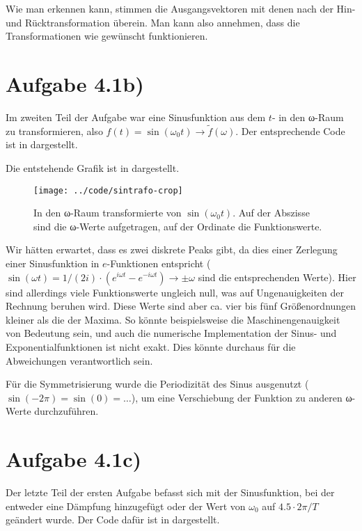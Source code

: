 Wie man erkennen kann, stimmen die Ausgangsvektoren mit denen nach der Hin- und
Rücktransformation überein. Man kann also annehmen, dass die Transformationen wie
gewünscht funktionieren.

\section*{Aufgabe 4.1b)}
Im zweiten Teil der Aufgabe war eine Sinusfunktion aus dem $t$- in den ω-Raum zu
transformieren, also $f(t) = \sin(ω_0t) → \tilde{f}(ω)$. Der entsprechende Code
ist in  dargestellt.



Die entstehende Grafik ist in  dargestellt.

\begin{figure}[htb]
\centering
  \texttt{[image: ../code/sintrafo-crop]}
  \caption{In den ω-Raum transformierte von $\sin(ω_0t)$. Auf der Abszisse sind
  die ω-Werte aufgetragen, auf der Ordinate die Funktionswerte.}
  \label{fig:sintrafo}
\end{figure}

Wir hätten erwartet, dass es zwei diskrete Peaks gibt, da dies einer Zerlegung 
einer Sinusfunktion in $e$-Funktionen entspricht ($\sin(ωt) = 1/(2i)\cdot(e^{iωt}
- e^{-iωt}) → \pm ω$ sind die entsprechenden Werte). Hier sind allerdings viele 
Funktionswerte ungleich null, was auf Ungenauigkeiten der Rechnung beruhen wird. 
Diese Werte sind aber ca. vier bis fünf Größenordnungen kleiner als die der Maxima.
So könnte beispielsweise die Maschinengenauigkeit von Bedeutung sein, und auch die
numerische Implementation der Sinus- und Exponentialfunktionen ist nicht exakt. 
Dies könnte durchaus für die Abweichungen verantwortlich sein.

Für die Symmetrisierung wurde die Periodizität des Sinus ausgenutzt ($\sin(-2π)
= \sin(0) = …$), um eine Verschiebung der Funktion zu anderen ω-Werte durchzuführen.

\section*{Aufgabe 4.1c)}
Der letzte Teil der ersten Aufgabe befasst sich mit der Sinusfunktion, bei der 
entweder eine Dämpfung hinzugefügt oder der Wert von $ω_0$ auf $4.5\cdot 2π/T$
geändert wurde. Der Code dafür ist in  dargestellt.

